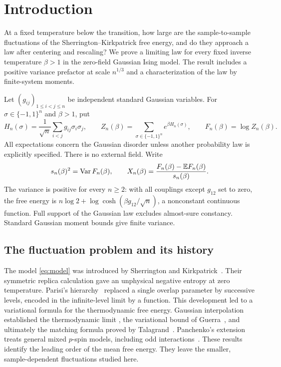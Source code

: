 \section{Introduction}\label{sec:introduction}

At a fixed temperature below the transition, how large are the
sample-to-sample fluctuations of the Sherrington--Kirkpatrick free
energy, and do they approach a law after centering and rescaling?
We prove a limiting law for every fixed inverse temperature $\beta>1$
in the zero-field Gaussian Ising model. The result includes a positive
variance prefactor at scale $n^{1/3}$ and a characterization of the
law by finite-system moments.

Let $(g_{ij})_{1\le i<j\le n}$ be independent standard Gaussian variables. For $\sigma\in\{-1,1\}^n$ and $\beta>1$, put
\begin{equation}\label{eq:model}
 H_n(\sigma)=\frac1{\sqrt n}\sum_{i<j}g_{ij}\sigma_i\sigma_j,
 \qquad Z_n(\beta)=\sum_{\sigma\in\{-1,1\}^n}e^{\beta H_n(\sigma)},
 \qquad F_n(\beta)=\log Z_n(\beta).
\end{equation}
All expectations concern the Gaussian disorder unless another probability law is explicitly specified. There is no external field. Write
\[
 s_n(\beta)^2=\operatorname{Var} F_n(\beta),
 \qquad X_n(\beta)=\frac{F_n(\beta)-\mathbb E F_n(\beta)}{s_n(\beta)}.
\]
The variance is positive for every $n\ge2$: with all couplings except $g_{12}$ set to zero, the free energy is $n\log2+\log\cosh(\beta g_{12}/\sqrt n)$, a nonconstant continuous function. Full support of the Gaussian law excludes almost-sure constancy. Standard Gaussian moment bounds give finite variance.

\subsection{The fluctuation problem and its history}

The model \eqref{eq:model} was introduced by Sherrington and
Kirkpatrick~\cite{SK1975}. Their symmetric replica calculation gave
an unphysical negative entropy at zero temperature. Parisi's
hierarchy~\cite{Parisi1979} replaced a single overlap parameter by
successive levels, encoded in the infinite-level limit by a function.
This development led to a variational formula for the thermodynamic
free energy.
Gaussian interpolation established the thermodynamic limit
\cite{GuerraToninelli2002}, the variational bound of
Guerra~\cite{Guerra2003}, and ultimately the matching formula proved by
Talagrand~\cite{Talagrand2006}. Panchenko's extension treats general
mixed $p$-spin models, including odd interactions~\cite{Panchenko2014}. These results identify the
leading order of the mean free energy. They leave the smaller,
sample-dependent fluctuations studied here.


